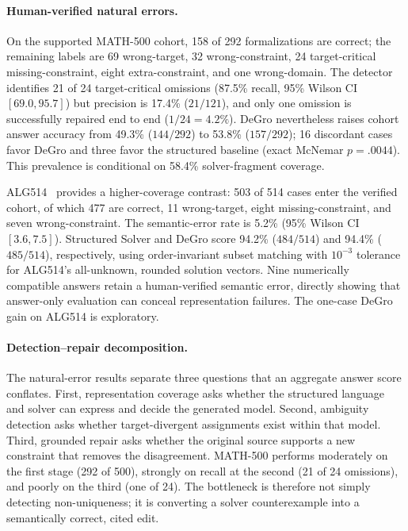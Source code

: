 \documentclass[sigconf,anonymous]{aamas}
\begin{document}
\paragraph{Human-verified natural errors.}
On the supported MATH-500 cohort, 158 of 292 formalizations are correct; the remaining labels are 69 wrong-target, 32 wrong-constraint, 24 target-critical missing-constraint, eight extra-constraint, and one wrong-domain.  The detector identifies 21 of 24 target-critical omissions (87.5\% recall, 95\% Wilson CI $[69.0,95.7]$) but precision is 17.4\% ($21/121$), and only one omission is successfully repaired end to end ($1/24=4.2\%$).  DeGro nevertheless raises cohort answer accuracy from 49.3\% ($144/292$) to 53.8\% ($157/292$); 16 discordant cases favor DeGro and three favor the structured baseline (exact McNemar $p=.0044$).  This prevalence is conditional on 58.4\% solver-fragment coverage.

ALG514~\cite{upadhyay2017derivations} provides a higher-coverage contrast: 503 of 514 cases enter the verified cohort, of which 477 are correct, 11 wrong-target, eight missing-constraint, and seven wrong-constraint.  The semantic-error rate is 5.2\% (95\% Wilson CI $[3.6,7.5]$).  Structured Solver and DeGro score 94.2\% ($484/514$) and 94.4\% ($485/514$), respectively, using order-invariant subset matching with $10^{-3}$ tolerance for ALG514's all-unknown, rounded solution vectors.  Nine numerically compatible answers retain a human-verified semantic error, directly showing that answer-only evaluation can conceal representation failures.  The one-case DeGro gain on ALG514 is exploratory.

\paragraph{Detection--repair decomposition.}
The natural-error results separate three questions that an aggregate answer score conflates.  First, representation coverage asks whether the structured language and solver can express and decide the generated model.  Second, ambiguity detection asks whether target-divergent assignments exist within that model.  Third, grounded repair asks whether the original source supports a new constraint that removes the disagreement.  MATH-500 performs moderately on the first stage (292 of 500), strongly on recall at the second (21 of 24 omissions), and poorly on the third (one of 24).  The bottleneck is therefore not simply detecting non-uniqueness; it is converting a solver counterexample into a semantically correct, cited edit.
\end{document}
